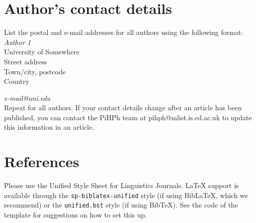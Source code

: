 \documentclass[article, a4paper, 12pt]{memoir}
\begin{document}
\section*{Author's contact details}
\label{sec:auth-cont-deta}

List the postal and e-mail addresses for all authors using the following format:\\

\noindent \textit{Author 1}\\
University of Somewhere\\
Street address\\
Town/city, postcode\\
Country

\vspace*{5pt}
\noindent \textit{e-mail@uni.edu}\\

\noindent Repeat for all authors. If your contact details change after an article has been published, you can contact the PiHPh team at pihph@mlist.is.ed.ac.uk to update this information in an article.


\section*{References}
\label{sec:references}

Please use the Unified Style Sheet for Linguistics Journals. \LaTeX{} support is available through the \texttt{sp-biblatex-unified} style (if using Bib\LaTeX, which we recommend) or the \texttt{unified.bst} style (if using Bib\TeX). See the code of the template for suggestions on how to set this up.





\printbibliography[title=References]

%  
\end{document}
